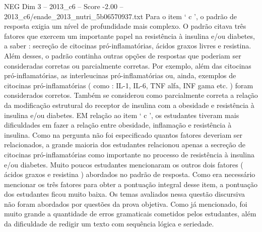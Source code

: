 \begin{textsample}{NEG Dim 3 – 2013\_c6 – Score -2.00 – 2013\_c6/enade\_2013\_nutri\_5b06570937.txt}
Para o item ‘ c ’, o padrão de resposta exigia um nível de profundidade mais complexo.
O padrão citava três fatores que exercem um importante papel na resistência à insulina e/ou diabetes, a saber : secreção de citocinas pró-inflamatórias, ácidos graxos livres e resistina.
Além desses, o padrão continha outras opções de respostas que poderiam ser consideradas corretas ou parcialmente corretas.
Por exemplo, além das citocinas pró-inflamatórias, as interleucinas pró-inflamatórias ou, ainda, exemplos de citocinas pró-inflamatórias ( como : IL-1, IL-6, TNF alfa, INF gama etc. ) foram considerados corretos.
Também se considerou como parcialmente correta a relação da modificação estrutural do receptor de insulina com a obesidade e resistência à insulina e/ou diabetes.
EM relação ao item ‘ c ’, os estudantes tiveram mais dificuldades em fazer a relação entre obesidade, inflamação e resistência à insulina.
Como na pergunta não foi especificado quantos fatores deveriam ser relacionados, a grande maioria dos estudantes relacionou apenas a secreção de citocinas pró-inflamatórias como importante no processo de resistência à insulina e/ou diabetes.
Muito poucos estudantes mencionaram os outros dois fatores ( ácidos graxos e resistina ) abordados no padrão de resposta.
Como era necessário mencionar os três fatores para obter a pontuação integral desse item, a pontuação dos estudantes ficou muito baixa.
Os temas avaliados nessa questão discursiva não foram abordados por questões da prova objetiva.
Como já mencionado, foi muito grande a quantidade de erros gramaticais cometidos pelos estudantes, além da dificuldade de redigir um texto com sequência lógica e seriedade.

\end{textsample}
